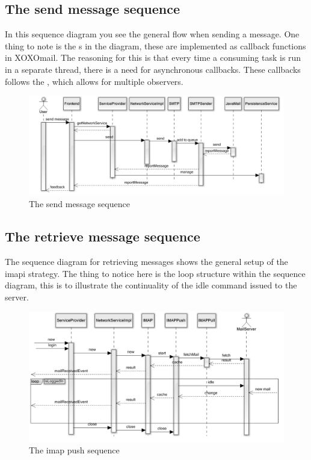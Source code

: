 \subsection{The send message sequence}
	In this sequence diagram you see the general flow when sending a message. One thing to note is the s in the diagram, these are implemented as callback functions in XOXOmail. The reasoning for this is that every time a consuming task is run in a separate thread, there is a need for asynchronous callbacks. These callbacks follows the \cite{bib:observer}, which allows for multiple observers. 
	\begin{figure}[H]
		\includegraphics[width=\textwidth]{SendSequence}
		\caption{The send message sequence}
		\label{fig:lifecycle}
	\end{figure}

\newpage

\subsection{The retrieve message sequence}
	The sequence diagram for retrieving messages shows the general setup of the \gls{imapi} strategy. The thing to notice here is the loop structure within the sequence diagram, this is to illustrate the continuality of the idle command issued to the server. 
	\begin{figure}[H]
		\includegraphics[width=\textwidth]{IMAPPushSequence}
		\caption{The imap push sequence}
		\label{fig:lifecycle}
	\end{figure}
	
